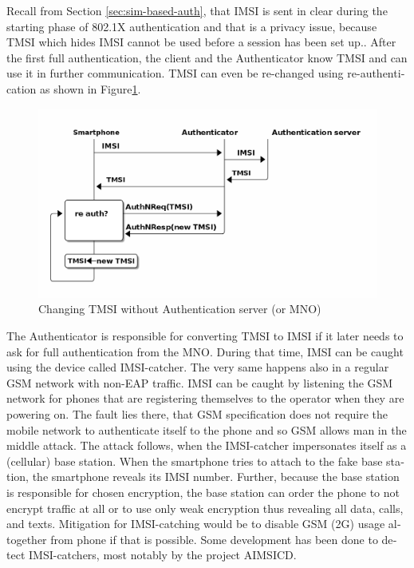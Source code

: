 \documentclass[12pt,a4paper,english]{tutthesis}
\begin{document}
\begin{otherlanguage}{english}
Recall from Section \ref{sec:sim-based-auth}, that IMSI is sent in clear 
during the starting phase of 802.1X authentication and that is a privacy 
issue, because TMSI which hides IMSI cannot be used before a session
has been set up.\cite[p.66]{rfc4186}.
After the first full authentication, the client and the Authenticator 
know TMSI and can use it in further communication. 
TMSI can even be re-changed using re-authentication as shown in Figure\ref{fig:tmsi}.

\begin{figure}[htb]
\centering
\includegraphics[width=.9\linewidth]{imsi-tmsi.png}
\caption{\label{fig:tmsi}Changing TMSI without Authentication server (or MNO)}
\end{figure}




The Authenticator is responsible for converting TMSI to IMSI if it
later needs to ask for full authentication from the MNO. During that
time, IMSI can be caught using the device called IMSI-catcher.  The
very same happens also in a regular GSM network with non-EAP traffic.
IMSI can be caught by listening the GSM network for phones that are
registering themselves to the operator when they are powering on.  The
fault lies there, that GSM specification does not require the mobile
network to authenticate itself to the phone and so GSM allows man in
the middle attack.  The attack follows, when the IMSI-catcher
impersonates itself as a (cellular) base station.  When the smartphone
tries to attach to the fake base station, the smartphone reveals its
IMSI number. Further, because the base station is responsible for
chosen encryption, the base station can order the phone to not encrypt
traffic at all or to use only weak encryption thus revealing all data,
calls, and texts. Mitigation for IMSI-catching would be to disable GSM
(2G) usage altogether from phone if that is
possible\cite{imsi-heise}. Some development has been done to detect
IMSI-catchers, most notably by the project AIMSICD\cite{aimcid}.



\end{otherlanguage}
\end{document}
